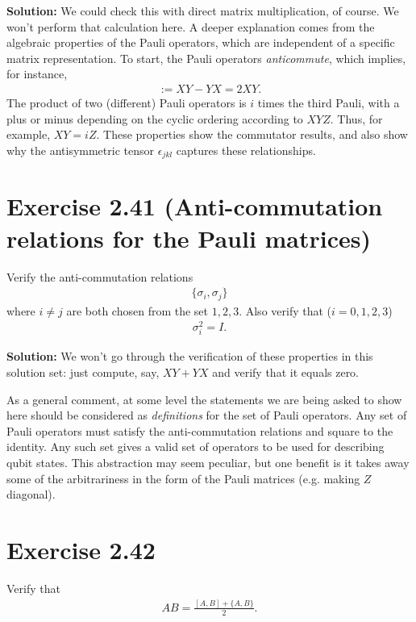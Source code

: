 \documentclass{book}
\begin{document}
    \textbf{Solution:} We could check this with direct matrix multiplication, of course. We won't perform that calculation here. A deeper explanation comes from the algebraic properties of the Pauli operators, which are independent of a specific matrix representation. To start, the Pauli operators \emph{anticommute}, which implies, for instance,
    \begin{align}
        [X,Y] := XY-YX = 2 XY.
    \end{align}
    The product of two (different) Pauli operators is $i$ times the third Pauli, with a plus or minus depending on the cyclic ordering according to $XYZ$. Thus, for example, $XY = iZ$. These properties show the commutator results, and also show why the antisymmetric tensor $\epsilon_{jkl}$ captures these relationships. 
    
\section*{Exercise 2.41 (Anti-commutation relations for the Pauli matrices)}
    Verify the anti-commutation relations
    \begin{align}
        \{\sigma_i, \sigma_j\}
    \end{align}
    where $i\neq j$ are both chosen from the set $1, 2, 3$. Also verify that ($i = 0,1,2,3$)
    \begin{align}
        \sigma_i^2 = I.
    \end{align}
    
    \textbf{Solution:} We won't go through the verification of these properties in this solution set: just compute, say, $XY + YX$ and verify that it equals zero. 
    
    As a general comment, at some level the statements we are being asked to show here should be considered as \emph{definitions} for the set of Pauli operators. Any set of Pauli operators must satisfy the anti-commutation relations and square to the identity. Any such set gives a valid set of operators to be used for describing qubit states. This abstraction may seem peculiar, but one benefit is it takes away some of the arbitrariness in the form of the Pauli matrices (e.g. making $Z$ diagonal). 
    
\section*{Exercise 2.42} 
    Verify that 
    \begin{align}
        AB = \frac{[A,B] + \{A,B\}}{2}.
    \end{align}
    
\end{document}
